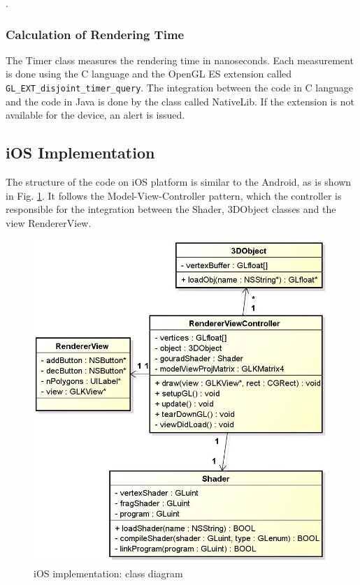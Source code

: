 \documentclass[10pt, conference, compsocconf]{IEEEtran}
\begin{document}
{	. 

	

\subsubsection{Calculation of Rendering Time}
\label{time}
The Timer class measures the rendering time in nanoseconds. Each measurement is
done using the C language and the OpenGL ES extension called 
\texttt{GL\_EXT\_disjoint\_timer\_query}. The integration between the code in C 
language and the code in Java is done by the class called NativeLib. If the
extension is not available for the device, an alert is issued.

\subsection{iOS Implementation}
\label{sec:ios}

The structure of the code on iOS platform is similar to the Android, as is 
shown in Fig. \ref{ios_diag}. It follows the Model-View-Controller pattern, which the
controller is responsible for the integration between the Shader, 3DObject
classes and the view RendererView. 

	\begin{figure}[!t]
	\centering
		\includegraphics[keepaspectratio=true,scale=0.41]{figures/ios_class_diagram.jpg}
	\caption{iOS implementation: class diagram}
	\label{ios_diag}
	\end{figure}

}
\end{document}
